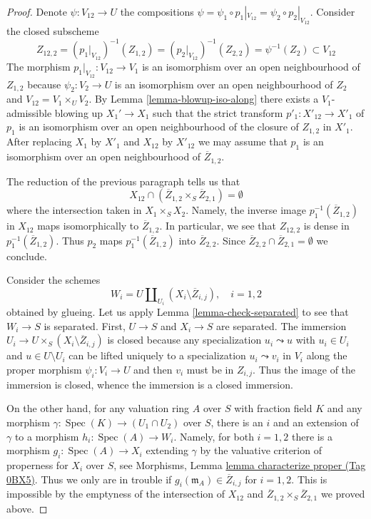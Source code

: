\documentclass{amsart}
\theoremstyle{plain}
\theoremstyle{definition}
\theoremstyle{remark}
\numberwithin{equation}{subsection}
\def\Spec{\mathop{\mathrm{Spec}}}
\begin{document}
\begin{proof}
\medskip\noindent
Denote $\psi : V_{12} \to U$ the compositions
$\psi = \psi_1 \circ p_1|_{V_{12}} = \psi_2 \circ p_2|_{V_{12}}$.
Consider the closed subscheme
$$
Z_{12, 2} =
(p_1|_{V_{12}})^{-1}(Z_{1, 2}) =
(p_2|_{V_{12}})^{-1}(Z_{2, 2}) =
\psi^{-1}(Z_2) \subset V_{12}
$$
The morphism $p_1|_{V_{12}} : V_{12} \to V_1$ is an isomorphism
over an open neighbourhood of $Z_{1, 2}$ because $\psi_2 : V_2 \to U$
is an isomorphism over an open neighbourhood of $Z_2$ and
$V_{12} = V_1 \times_U V_2$.
By Lemma \ref{lemma-blowup-iso-along}
there exists a $V_1$-admissible blowing up $X_1' \to X_1$
such that the strict transform $p'_1 : X'_{12} \to X'_1$
of $p_1$ is an isomorphism over an open neighbourhood of
the closure of $Z_{1, 2}$ in $X'_1$.
After replacing $X_1$ by $X'_1$ and $X_{12}$ by $X'_{12}$
we may assume that $p_1$ is an isomorphism over an open
neighbourhood of $\overline{Z}_{1, 2}$.

\medskip\noindent
The reduction of the previous paragraph tells us that
$$
X_{12} \cap (\overline{Z}_{1, 2} \times_S \overline{Z}_{2, 1}) = \emptyset
$$
where the intersection taken in $X_1 \times_S X_2$. Namely, the inverse
image $p_1^{-1}(\overline{Z}_{1, 2})$ in $X_{12}$ maps isomorphically
to $\overline{Z}_{1, 2}$. In particular, we see that $Z_{12, 2}$
is dense in $p_1^{-1}(\overline{Z}_{1, 2})$. Thus $p_2$ maps
$p_1^{-1}(\overline{Z}_{1, 2})$ into $\overline{Z}_{2, 2}$.
Since $\overline{Z}_{2, 2} \cap \overline{Z}_{2, 1} = \emptyset$
we conclude.

\medskip\noindent
Consider the schemes
$$
W_i = U \coprod\nolimits_{U_i} (X_i \setminus \overline{Z}_{i, j}),
\quad i = 1, 2
$$
obtained by glueing. Let us apply Lemma \ref{lemma-check-separated}
to see that $W_i \to S$ is separated. First,
$U \to S$ and $X_i \to S$ are separated. The immersion
$U_i \to U \times_S (X_i \setminus \overline{Z}_{i, j})$
is closed because any specialization $u_i \leadsto u$
with $u_i \in U_i$ and $u \in U \setminus U_i$
can be lifted uniquely to a specialization
$u_i \leadsto v_i$ in $V_i$ along the proper morphism
$\psi_i : V_i \to U$ and then $v_i$ must be in $Z_{i, j}$.
Thus the image of the immersion is closed, whence the immersion
is a closed immersion.

\medskip\noindent
On the other hand, for any valuation ring $A$ over $S$ with fraction field $K$
and any morphism $\gamma : \Spec(K) \to (U_1 \cap U_2)$ over $S$, there
is an $i$ and an extension of $\gamma$ to a morphism $h_i : \Spec(A) \to W_i$.
Namely, for both $i = 1, 2$ there is a morphism
$g_i : \Spec(A) \to X_i$ extending $\gamma$ by the
valuative criterion of properness for $X_i$ over $S$, see
Morphisms, Lemma \href{https://stacks.math.columbia.edu/tag/0BX5}{lemma characterize proper (Tag 0BX5)}.
Thus we only are in trouble
if $g_i(\mathfrak m_A) \in \overline{Z}_{i, j}$ for $i = 1, 2$. This is
impossible by the emptyness of the intersection of $X_{12}$ and
$\overline{Z}_{1, 2} \times_S \overline{Z}_{2, 1}$ we proved above.


\end{proof}
\end{document}
